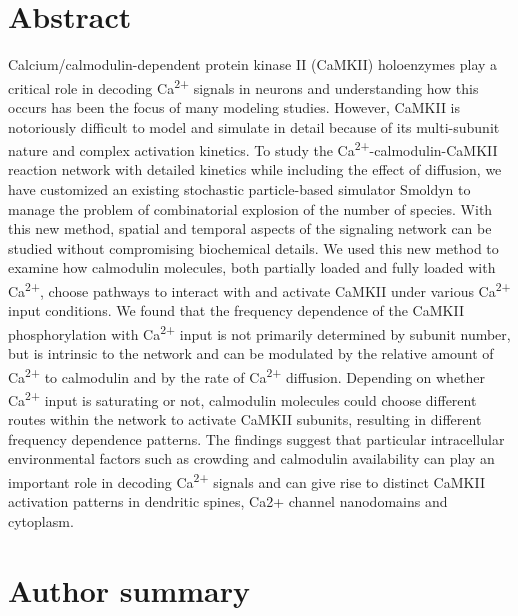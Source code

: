 \documentclass[10pt,letterpaper]{article}
\begin{document}
\section*{Abstract}
Calcium/calmodulin-dependent protein kinase II (CaMKII) holoenzymes play a critical role in decoding Ca\textsuperscript{2+} signals in neurons and understanding how this occurs has been the focus of many modeling studies. However, CaMKII is notoriously difficult to model and simulate in detail because of its multi-subunit nature and complex activation kinetics. To study the Ca\textsuperscript{2+}-calmodulin-CaMKII reaction network with detailed kinetics while including the effect of diffusion, we have customized an existing stochastic particle-based simulator Smoldyn to manage the problem of combinatorial explosion of the number of species. With this new method, spatial and temporal aspects of the signaling network can be studied without compromising biochemical details. We used this new method to examine how calmodulin molecules, both partially loaded and fully loaded with Ca\textsuperscript{2+}, choose pathways to interact with and activate CaMKII under various Ca\textsuperscript{2+} input conditions. We found that the frequency dependence of the CaMKII phosphorylation with Ca\textsuperscript{2+} input is not primarily determined by subunit number, but is intrinsic to the network and can be modulated by the relative amount of Ca\textsuperscript{2+} to calmodulin and by the rate of Ca\textsuperscript{2+} diffusion. Depending on whether Ca\textsuperscript{2+} input is saturating or not, calmodulin molecules could choose different routes within the network to activate CaMKII subunits, resulting in different frequency dependence patterns. The findings suggest that particular intracellular environmental factors such as crowding and calmodulin availability can play an important role in decoding Ca\textsuperscript{2+} signals and can give rise to distinct CaMKII activation patterns in dendritic spines, Ca2+ channel nanodomains and cytoplasm.
\section*{Author summary}
\end{document}
